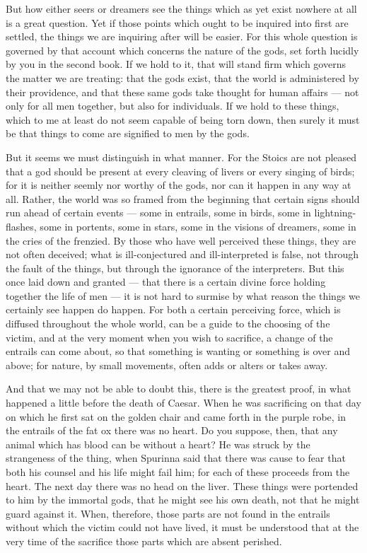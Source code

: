  But how either seers or dreamers see the things which as yet exist nowhere at all is a great question. Yet if those points which ought to be inquired into first are settled, the things we are inquiring after will be easier. For this whole question is governed by that account which concerns the nature of the gods, set forth lucidly by you in the second book. If we hold to it, that will stand firm which governs the matter we are treating: that the gods exist, that the world is administered by their providence, and that these same gods take thought for human affairs — not only for all men together, but also for individuals. If we hold to these things, which to me at least do not seem capable of being torn down, then surely it must be that things to come are signified to men by the gods.

 But it seems we must distinguish in what manner. For the Stoics are not pleased that a god should be present at every cleaving of livers or every singing of birds; for it is neither seemly nor worthy of the gods, nor can it happen in any way at all. Rather, the world was so framed from the beginning that certain signs should run ahead of certain events — some in entrails, some in birds, some in lightning-flashes, some in portents, some in stars, some in the visions of dreamers, some in the cries of the frenzied. By those who have well perceived these things, they are not often deceived; what is ill-conjectured and ill-interpreted is false, not through the fault of the things, but through the ignorance of the interpreters. But this once laid down and granted — that there is a certain divine force holding together the life of men — it is not hard to surmise by what reason the things we certainly see happen do happen. For both a certain perceiving force, which is diffused throughout the whole world, can be a guide to the choosing of the victim, and at the very moment when you wish to sacrifice, a change of the entrails can come about, so that something is wanting or something is over and above; for nature, by small movements, often adds or alters or takes away.

 And that we may not be able to doubt this, there is the greatest proof, in what happened a little before the death of Caesar. When he was sacrificing on that day on which he first sat on the golden chair and came forth in the purple robe, in the entrails of the fat ox there was no heart. Do you suppose, then, that any animal which has blood can be without a heart? He was struck by the strangeness of the thing, when Spurinna said that there was cause to fear that both his counsel and his life might fail him; for each of these proceeds from the heart. The next day there was no head on the liver. These things were portended to him by the immortal gods, that he might see his own death, not that he might guard against it. When, therefore, those parts are not found in the entrails without which the victim could not have lived, it must be understood that at the very time of the sacrifice those parts which are absent perished.

